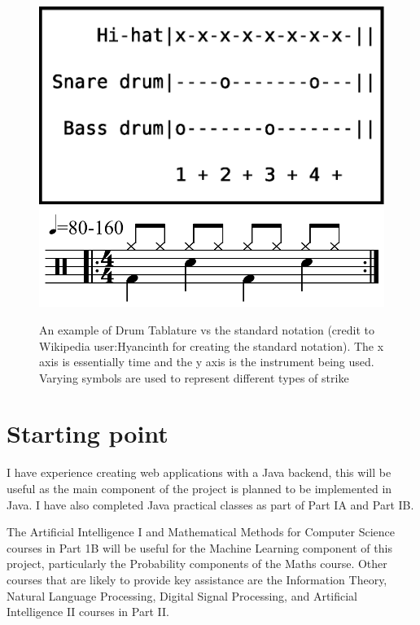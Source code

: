 \documentclass[12pt,a4]{article}
\begin{document}
\begin{figure}[h]    
            \centerline{\includegraphics[scale=0.5]{figures/exampledrumtab.eps}\\
            \includegraphics[scale=0.3]{figures/Characteristic_rock_drum_pattern.png}}
    \caption{\label{exampleDrumTab} An example of Drum Tablature vs the standard notation (credit to Wikipedia user:Hyancinth for creating the standard notation). The x axis is essentially time and the y axis is the instrument being used. Varying symbols are used to represent different types of strike}
\end{figure}







    \section{Starting point}
I have experience creating web applications with a Java backend, this will be useful as the main component of the project is planned to be implemented in Java. I have also completed Java practical classes as part of Part IA and Part IB.

The Artificial Intelligence I and Mathematical Methods for Computer Science courses in Part 1B will be useful for the Machine Learning component of this project, particularly the Probability components of the Maths course. Other courses that are likely to provide key assistance are the Information Theory, Natural Language Processing, Digital Signal Processing, and Artificial Intelligence II courses in Part II.
\end{document}
